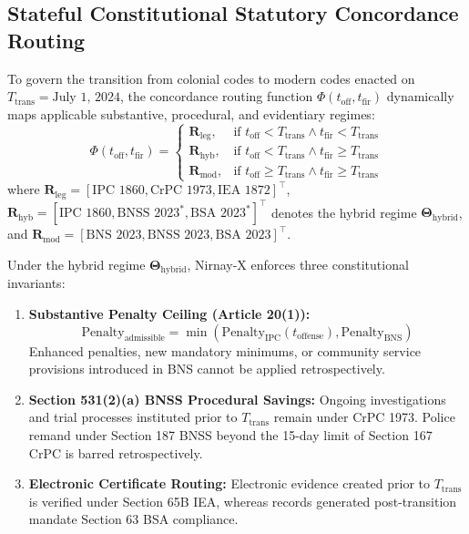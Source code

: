 \documentclass[conference]{IEEEtran}
\begin{document}
\subsection{Stateful Constitutional Statutory Concordance Routing}
To govern the transition from colonial codes to modern codes enacted on $T_{\text{trans}} = \text{July 1, 2024}$, the concordance routing function $\Phi(t_{\text{off}}, t_{\text{fir}})$ dynamically maps applicable substantive, procedural, and evidentiary regimes:
\begin{equation}
\Phi(t_{\text{off}}, t_{\text{fir}}) = \begin{cases}
\mathbf{R}_{\text{leg}}, & \text{if } t_{\text{off}} < T_{\text{trans}} \land t_{\text{fir}} < T_{\text{trans}} \\
\mathbf{R}_{\text{hyb}}, & \text{if } t_{\text{off}} < T_{\text{trans}} \land t_{\text{fir}} \ge T_{\text{trans}} \\
\mathbf{R}_{\text{mod}}, & \text{if } t_{\text{off}} \ge T_{\text{trans}} \land t_{\text{fir}} \ge T_{\text{trans}}
\end{cases}
\end{equation}
where $\mathbf{R}_{\text{leg}} = [\text{IPC 1860}, \text{CrPC 1973}, \text{IEA 1872}]^\top$, $\mathbf{R}_{\text{hyb}} = [\text{IPC 1860}, \text{BNSS 2023}^*, \text{BSA 2023}^*]^\top$ denotes the hybrid regime $\mathbf{\Theta}_{\text{hybrid}}$, and $\mathbf{R}_{\text{mod}} = [\text{BNS 2023}, \text{BNSS 2023}, \text{BSA 2023}]^\top$.

Under the hybrid regime $\mathbf{\Theta}_{\text{hybrid}}$, Nirnay-X enforces three constitutional invariants:
\begin{enumerate}
    \item \textbf{Substantive Penalty Ceiling (Article 20(1)):}
    \begin{equation}
    \text{Penalty}_{\text{admissible}} = \min\left(\text{Penalty}_{\text{IPC}}(t_{\text{offense}}), \text{Penalty}_{\text{BNS}}\right)
    \end{equation}
    Enhanced penalties, new mandatory minimums, or community service provisions introduced in BNS cannot be applied retrospectively.
    \item \textbf{Section 531(2)(a) BNSS Procedural Savings:} Ongoing investigations and trial processes instituted prior to $T_{\text{trans}}$ remain under CrPC 1973. Police remand under Section 187 BNSS beyond the 15-day limit of Section 167 CrPC is barred retrospectively.
    \item \textbf{Electronic Certificate Routing:} Electronic evidence created prior to $T_{\text{trans}}$ is verified under Section 65B IEA, whereas records generated post-transition mandate Section 63 BSA compliance.
\end{enumerate}
\end{document}

